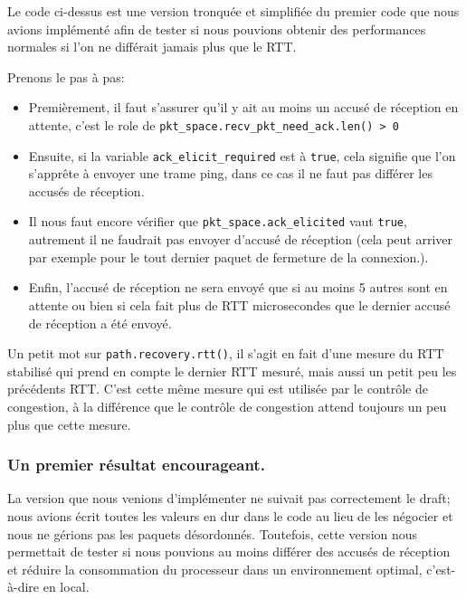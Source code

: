 Le code ci-dessus est une version tronquée et simplifiée du premier code que nous avions implémenté afin de tester si nous pouvions obtenir des performances normales si l'on ne différait jamais plus que le RTT.

\vspace{1cm}

Prenons le pas à pas:
\begin{itemize}
    \item Premièrement, il faut s'assurer qu'il y ait au moins un accusé de réception en attente, c'est le role de \verb|pkt_space.recv_pkt_need_ack.len() > 0|
    \item Ensuite, si la variable \verb|ack_elicit_required| est à \verb|true|, cela signifie que l'on s'apprête à envoyer une trame ping, dans ce cas il ne faut pas différer les accusés de réception.
    \item Il nous faut encore vérifier que \verb|pkt_space.ack_elicited| vaut \verb|true|, autrement il ne faudrait pas envoyer d'accusé de réception (cela peut arriver par exemple pour le tout dernier paquet de fermeture de la connexion.).
    \item Enfin, l'accusé de réception ne sera envoyé que si au moins 5 autres sont en attente ou bien si cela fait plus de RTT microsecondes que le dernier accusé de réception a été envoyé.
\end{itemize}

Un petit mot sur \verb|path.recovery.rtt()|, il s'agit en fait d'une mesure du RTT stabilisé qui prend en compte le dernier RTT mesuré, mais aussi un petit peu les précédents RTT. C'est cette même mesure qui est utilisée par le contrôle de congestion, à la différence que le contrôle de congestion attend toujours un peu plus que cette mesure.

\subsubsection{Un premier résultat encourageant.}

La version que nous venions d'implémenter ne suivait pas correctement le draft; nous avions écrit toutes les valeurs en dur dans le code au lieu de les négocier et nous ne gérions pas les paquets désordonnés. Toutefois, cette version nous permettait de tester si nous pouvions au moins différer des accusés de réception et réduire la consommation du processeur dans un environnement optimal, c'est-à-dire en local.

\vspace{0.5cm}


